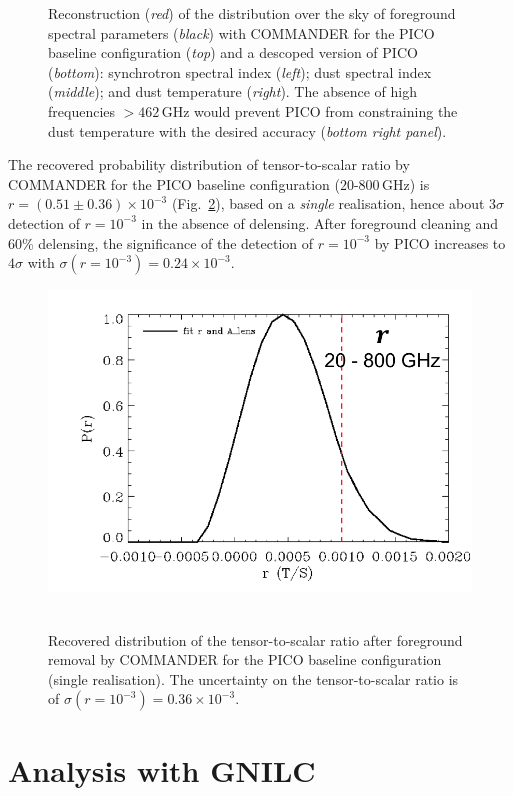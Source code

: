 \documentclass[12pt]{article}
\begin{document}
\begin{figure}
\begin{center}
  \end{center}
\caption{Reconstruction (\emph{red}) of the distribution over the sky of foreground spectral parameters (\emph{black}) with COMMANDER for the PICO baseline configuration (\emph{top}) and a descoped version of PICO (\emph{bottom}): synchrotron spectral index (\emph{left}); dust spectral index (\emph{middle}); and dust temperature (\emph{right}). The absence of high frequencies $> 462$\,GHz would prevent PICO from constraining the dust temperature with the desired accuracy (\emph{bottom right panel}).}
\label{Fig:commander_pico_90p91_foregrounds}
\end{figure}

The recovered probability distribution of tensor-to-scalar ratio by COMMANDER for the PICO baseline configuration ({$20$-$800$\,GHz}) is $r=(0.51\pm0.36)\times 10^{-3}$ (Fig.~\ref{Fig:commander_pico_90p91_r_baseline}), based on a \emph{single} realisation, hence about $3\sigma$ detection of $r=10^{-3}$ in the absence of delensing. After foreground cleaning and 60\% delensing, the significance of the detection of $r=10^{-3}$ by PICO increases to $4\sigma$ with $\sigma(r=10^{-3})=0.24\times 10^{-3}$.

\begin{figure}
  \begin{center}
     \includegraphics[width=0.5\columnwidth]{figures_memo/tensor_to-scalar_baseline.png}~
  \end{center}
\caption{Recovered distribution of the tensor-to-scalar ratio after foreground removal by COMMANDER for the PICO baseline configuration (single realisation). The uncertainty on the tensor-to-scalar ratio is of $\sigma(r=10^{-3})=0.36\times 10^{-3}$. }
\label{Fig:commander_pico_90p91_r_baseline}
\end{figure}

\section{Analysis with GNILC}
\end{document}
